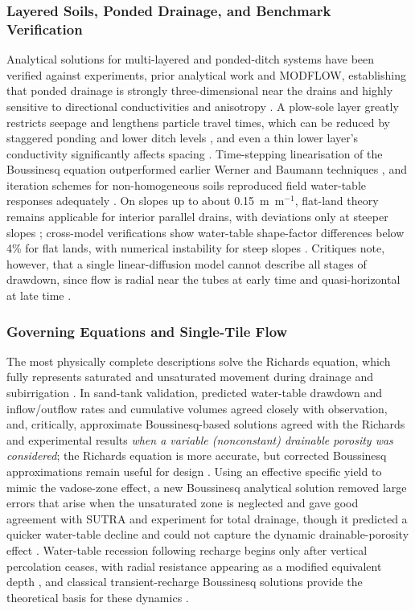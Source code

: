 \subsubsection{Layered Soils, Ponded Drainage, and Benchmark Verification}

Analytical solutions for multi-layered and ponded-ditch systems have been verified against experiments, prior analytical work and MODFLOW, establishing that ponded drainage is strongly three-dimensional near the drains and highly sensitive to directional conductivities and anisotropy \parencite{Chakrabarti2020,Sarmah2015,SHARMA1991,Afruzi2014}. A plow-sole layer greatly restricts seepage and lengthens particle travel times, which can be reduced by staggered ponding and lower ditch levels \parencite{Chakrabarti2020,Sarmah2015}, and even a thin lower layer's conductivity significantly affects spacing \parencite{SHARMA1991}. Time-stepping linearisation of the Boussinesq equation outperformed earlier Werner and Baumann techniques \parencite{Lin2025}, and iteration schemes for non-homogeneous soils reproduced field water-table responses adequately \parencite{CHU1977}. On slopes up to about 0.15~m~m$^{-1}$, flat-land theory remains applicable for interior parallel drains, with deviations only at steeper slopes \parencite{FIPPS1989}; cross-model verifications show water-table shape-factor differences below 4\% for flat lands, with numerical instability for steep slopes \parencite{LORRE1994,Nédélec2010}. Critiques note, however, that a single linear-diffusion model cannot describe all stages of drawdown, since flow is radial near the tubes at early time and quasi-horizontal at late time \parencite{Kacimov2000}.

\subsubsection{Governing Equations and Single-Tile Flow}

The most physically complete descriptions solve the Richards equation, which fully represents saturated and unsaturated movement during drainage and subirrigation \parencite{TANG1977}. In sand-tank validation, predicted water-table drawdown and inflow/outflow rates and cumulative volumes agreed closely with observation, and, critically, approximate Boussinesq-based solutions agreed with the Richards and experimental results \emph{when a variable (nonconstant) drainable porosity was considered}; the Richards equation is more accurate, but corrected Boussinesq approximations remain useful for design \parencite{TANG1977}. Using an effective specific yield to mimic the vadose-zone effect, a new Boussinesq analytical solution removed large errors that arise when the unsaturated zone is neglected and gave good agreement with SUTRA and experiment for total drainage, though it predicted a quicker water-table decline and could not capture the dynamic drainable-porosity effect \parencite{Xin2016c}. Water-table recession following recharge begins only after vertical percolation ceases, with radial resistance appearing as a modified equivalent depth \parencite{VANDELEUR1959}, and classical transient-recharge Boussinesq solutions provide the theoretical basis for these dynamics \parencite{SINGH1980,Bouarfa2000}.

